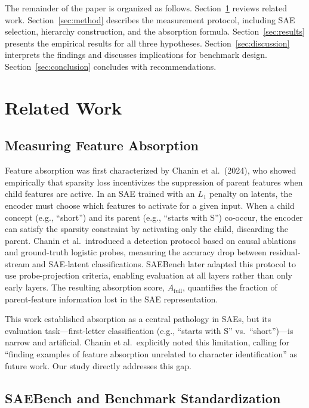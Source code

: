 \documentclass{article}
\begin{document}
The remainder of the paper is organized as follows. Section~\ref{sec:related} reviews related work. Section~\ref{sec:method} describes the measurement protocol, including SAE selection, hierarchy construction, and the absorption formula. Section~\ref{sec:results} presents the empirical results for all three hypotheses. Section~\ref{sec:discussion} interprets the findings and discusses implications for benchmark design. Section~\ref{sec:conclusion} concludes with recommendations.

\section{Related Work}
\label{sec:related}

\subsection{Measuring Feature Absorption}

Feature absorption was first characterized by Chanin et al.~(2024), who showed empirically that sparsity loss incentivizes the suppression of parent features when child features are active. In an SAE trained with an $L_1$ penalty on latents, the encoder must choose which features to activate for a given input. When a child concept (e.g., ``short'') and its parent (e.g., ``starts with S'') co-occur, the encoder can satisfy the sparsity constraint by activating only the child, discarding the parent. Chanin et al.~introduced a detection protocol based on causal ablations and ground-truth logistic probes, measuring the accuracy drop between residual-stream and SAE-latent classifications. SAEBench later adapted this protocol to use probe-projection criteria, enabling evaluation at all layers rather than only early layers. The resulting absorption score, $A_{\text{full}}$, quantifies the fraction of parent-feature information lost in the SAE representation.

This work established absorption as a central pathology in SAEs, but its evaluation task---first-letter classification (e.g., ``starts with S'' vs.~``short'')---is narrow and artificial. Chanin et al.~explicitly noted this limitation, calling for ``finding examples of feature absorption unrelated to character identification'' as future work. Our study directly addresses this gap.

\subsection{SAEBench and Benchmark Standardization}
\end{document}
